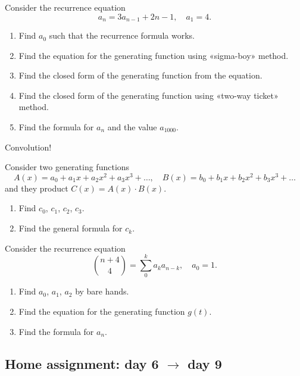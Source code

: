 \documentclass[12pt]{article}
\begin{document}
\begin{exercise}
    Consider the recurrence equation
    \[
    a_n =  3a_{n-1} + 2n - 1, \quad a_1 = 4.
    \]
    \begin{enumerate}[label=\alph*)]
        \item Find $a_0$ such that the recurrence formula works.
        \item Find the equation for the generating function using «sigma-boy» method. 
        \item Find the closed form of the generating function from the equation. 
        \item Find the closed form of the generating function using «two-way ticket» method.
        \item Find the formula for $a_n$ and the value $a_{1000}$.
    \end{enumerate}
\end{exercise}

\begin{exercise}
    Convolution!

    Consider two generating functions 
    \[
    A(x) = a_0 + a_1 x + a_2 x^2 + a_3 x^3 + \dots, \quad B(x) = b_0 + b_1 x + b_2 x^2 + b_3 x^3 + \dots
    \]    
    and they product $C(x) = A(x) \cdot B(x)$.
    \begin{enumerate}[label=\alph*)]
        \item Find $c_0$, $c_1$, $c_2$, $c_3$.
        \item Find the general formula for $c_k$. 
    \end{enumerate}
\end{exercise}


\begin{exercise}
    Consider the recurrence equation
    \[
    {n+4 \choose 4 } =  \sum_0^k a_k a_{n-k}, \quad a_0 = 1.
    \]
    \begin{enumerate}
        \item Find $a_0$, $a_1$, $a_2$ by bare hands. 
        \item Find the equation for the generating function $g(t)$. 
        \item Find the formula for $a_n$. 
    \end{enumerate}
\end{exercise}


\subsection*{Home assignment: day 6 $\to$ day 9}
\end{document}
